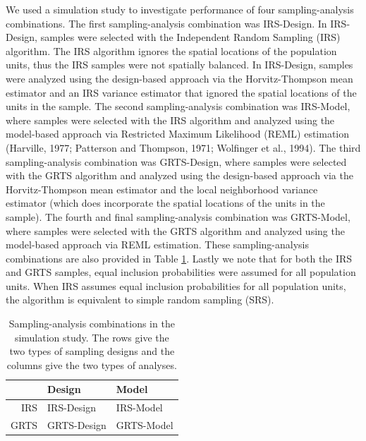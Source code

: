 \documentclass[]{elsarticle} %
\begin{document}
We used a simulation study to investigate performance of four
sampling-analysis combinations. The first sampling-analysis combination
was IRS-Design. In IRS-Design, samples were selected with the
Independent Random Sampling (IRS) algorithm. The IRS algorithm ignores
the spatial locations of the population units, thus the IRS samples were
not spatially balanced. In IRS-Design, samples were analyzed using the
design-based approach via the Horvitz-Thompson mean estimator and an IRS
variance estimator that ignored the spatial locations of the units in
the sample. The second sampling-analysis combination was IRS-Model,
where samples were selected with the IRS algorithm and analyzed using
the model-based approach via Restricted Maximum Likelihood (REML)
estimation (Harville, 1977; Patterson and Thompson, 1971; Wolfinger et
al., 1994). The third sampling-analysis combination was GRTS-Design,
where samples were selected with the GRTS algorithm and analyzed using
the design-based approach via the Horvitz-Thompson mean estimator and
the local neighborhood variance estimator (which does incorporate the
spatial locations of the units in the sample). The fourth and final
sampling-analysis combination was GRTS-Model, where samples were
selected with the GRTS algorithm and analyzed using the model-based
approach via REML estimation. These sampling-analysis combinations are
also provided in Table \ref{tab:designanalysis}. Lastly we note that for
both the IRS and GRTS samples, equal inclusion probabilities were
assumed for all population units. When IRS assumes equal inclusion
probabilities for all population units, the algorithm is equivalent to
simple random sampling (SRS).

\begin{table}[ht]
\centering
\begin{tabular}{r|ll}
  \hline
 & Design & Model \\ 
  \hline
IRS & IRS-Design & IRS-Model \\ 
  GRTS & GRTS-Design & GRTS-Model \\ 
   \hline
\end{tabular}
\caption{\label{tab:designanalysis} Sampling-analysis combinations in the simulation study. The rows give the two types of sampling designs and the columns give the two types of analyses.} 
\end{table}
\end{document}
